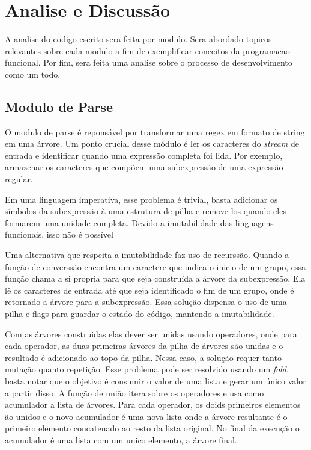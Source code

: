 \section{Analise e Discussão}

A analise do codigo escrito sera feita por modulo.
Sera abordado topicos relevantes sobre cada modulo a fim de exemplificar conceitos da programacao funcional.
Por fim, sera feita uma analise sobre o processo de desenvolvimento como um todo.

\subsection{Modulo de Parse}

O modulo de parse é reponsável por transformar uma regex em formato de string em uma árvore.
Um ponto crucial desse módulo é ler os caracteres do \emph{stream} de entrada e identificar quando uma expressão completa foi lida.
Por exemplo, armazenar os caracteres que compõem uma subexpressão de uma expressão regular.

Em uma linguagem imperativa, esse problema é trivial, basta adicionar os símbolos da subexpressão à uma estrutura de pilha e remove-los quando eles formarem uma unidade completa.
Devido a imutabilidade das linguagens funcionais, isso não é possível

Uma alternativa que respeita a imutabilidade faz uso de recurssão.
Quando a função de converssão encontra um caractere que indica o inicio de um grupo, essa função chama a si propria para que seja construída a árvore da subexpressão.
Ela lê os caracteres de entrada até que seja identificado o fim de um grupo, onde é retornado a árvore para a subexpressão.
Essa solução dispensa o uso de uma pilha e flags para guardar o estado do código, mantendo a imutabilidade.

Com as árvores construidas elas dever ser unidas usando operadores, onde para cada operador, as duas primeiras árvores da pilha de árvores são unidas e o resultado é adicionado ao topo da pilha.
Nessa caso, a solução requer tanto mutação quanto repetição.
Esse problema pode ser resolvido usando um \emph{fold}, basta notar que o objetivo é consumir o valor de uma lista e gerar um único valor a partir disso.
A função de união itera sobre os operadores e usa como acumulador a lista de árvores.
Para cada operador, os doids primeiros elementos ão unidos e o novo acumulador é uma nova lista onde a árvore resultante é o primeiro elemento concatenado ao resto da lista original.
No final da execução o acumulador é uma lista com um unico elemento, a árvore final.

